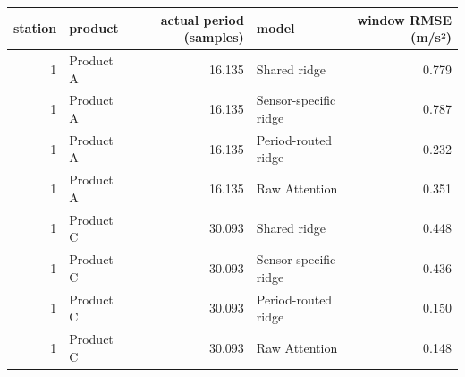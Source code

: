 \begin{tabular}{rlrlr}
\toprule
station & product & actual period (samples) & model & window RMSE (m/s²) \\
\midrule
1 & Product A & 16.135 & Shared ridge & 0.779 \\
1 & Product A & 16.135 & Sensor-specific ridge & 0.787 \\
1 & Product A & 16.135 & Period-routed ridge & 0.232 \\
1 & Product A & 16.135 & Raw Attention & 0.351 \\
1 & Product C & 30.093 & Shared ridge & 0.448 \\
1 & Product C & 30.093 & Sensor-specific ridge & 0.436 \\
1 & Product C & 30.093 & Period-routed ridge & 0.150 \\
1 & Product C & 30.093 & Raw Attention & 0.148 \\
\bottomrule
\end{tabular}
